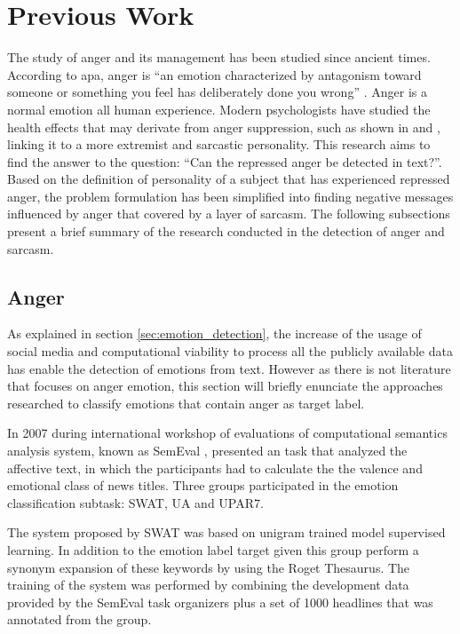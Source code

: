 
\section{Previous Work}
\label{sec:previous_work}

The study of anger and its management has been studied since ancient times. According to \acrfull{apa}, anger is ``an emotion characterized by antagonism toward someone or something you feel has deliberately done you wrong'' \cite{angerAPA}. Anger is a normal emotion all human experience. Modern psychologists have studied the health effects that may derivate from anger suppression, such as shown in \cite{kemp1995anger} and \cite{staicu2010anger}, linking it to a more extremist and sarcastic personality. This research aims to find the answer to the question: ``Can the repressed anger be detected in text?''. Based on the definition of personality of a subject that has experienced repressed anger, the problem formulation has been simplified into finding negative messages influenced by anger that covered by a layer of sarcasm. The following subsections present a brief summary of the research conducted in the detection of anger and sarcasm.

\subsection{Anger}
\label{subsec:anger}

As explained in section \ref{sec:emotion_detection}, the increase of the usage of social media and computational viability to process all the publicly available data has enable the detection of emotions from text. However as there is not literature that focuses on anger emotion, this section will briefly enunciate the approaches researched to classify emotions that contain anger as target label.

In 2007 during international workshop of evaluations of computational semantics analysis system, known as SemEval \cite{SemEvalPortal}, presented an task that analyzed the affective text, in which the participants had to calculate the the valence and emotional class of news titles. Three groups participated in the emotion classification subtask: SWAT, UA and UPAR7. 

The system proposed by SWAT was based on unigram trained model supervised learning. In addition to the emotion label target given this group perform a synonym expansion of these keywords by using the Roget Thesaurus. The training of the system was performed by combining the development data provided by the SemEval task organizers plus a set of 1000 headlines that was annotated from the group.

